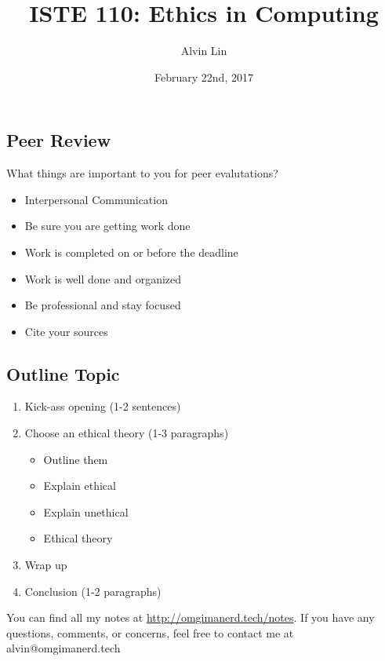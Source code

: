 \documentclass[letterpaper, 12pt]{article}
\title{ISTE 110: Ethics in Computing}
\author{Alvin Lin}
\date{February 22nd, 2017}
\begin{document}
\maketitle

\subsection*{Peer Review}
What things are important to you for peer evalutations?
\begin{itemize}
  \item Interpersonal Communication
  \item Be sure you are getting work done
  \item Work is completed on or before the deadline
  \item Work is well done and organized
  \item Be professional and stay focused
  \item Cite your sources
\end{itemize}

\subsection*{Outline Topic}
\begin{enumerate}
  \item Kick-ass opening (1-2 sentences)
  \item Choose an ethical theory (1-3 paragraphs)
  \begin{itemize}
    \item Outline them
    \item Explain ethical
    \item Explain unethical
    \item Ethical theory
  \end{itemize}
  \item Wrap up
  \item Conclusion (1-2 paragraphs)
\end{enumerate}

\begin{center}
  You can find all my notes at \url{http://omgimanerd.tech/notes}. If you have
  any questions, comments, or concerns, feel free to contact me at
  alvin@omgimanerd.tech
\end{center}
\end{document}
